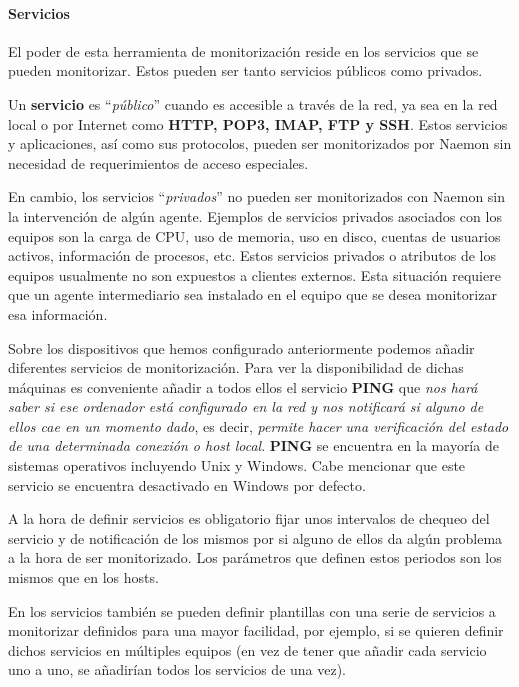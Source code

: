 \paragraph{Servicios}

El poder de esta herramienta de monitorización reside en los servicios que se pueden monitorizar. Estos pueden ser tanto servicios públicos como privados.  \cite{naemoncfg}

Un \textbf{servicio} es “\textit{público}” cuando es accesible a través de la red, ya sea en la red local o por Internet como \textbf{HTTP, POP3, IMAP, FTP y SSH}. Estos servicios y aplicaciones, así como sus protocolos, pueden ser monitorizados por Naemon sin necesidad de requerimientos de acceso especiales.

En cambio, los servicios “\textit{privados}” no pueden ser monitorizados con Naemon sin la intervención de algún agente. Ejemplos de servicios privados asociados con los equipos son la carga de CPU, uso de memoria, uso en disco, cuentas de usuarios activos, información de procesos, etc. Estos servicios privados o atributos de los equipos usualmente no son expuestos a clientes externos. Esta situación requiere que un agente intermediario sea instalado en el equipo que se desea monitorizar esa información.

Sobre los dispositivos que hemos configurado anteriormente podemos añadir diferentes servicios de monitorización. Para ver la disponibilidad de dichas máquinas es conveniente añadir a todos ellos el servicio \textbf{PING} \cite{monitoring} que \textit{nos hará saber si ese ordenador está configurado en la red y nos notificará si alguno de ellos cae en un momento dado}, es decir, \textit{permite hacer una verificación del estado de una determinada conexión o host local}. \textbf{PING} se encuentra en la mayoría de sistemas operativos incluyendo Unix y Windows. Cabe mencionar que este servicio se encuentra desactivado en Windows por defecto.

A la hora de definir servicios es obligatorio fijar unos intervalos de chequeo del servicio y de notificación de los mismos por si alguno de ellos da algún problema a la hora de ser monitorizado. Los parámetros que definen estos periodos son los mismos que en los hosts.

En los servicios también se pueden definir plantillas con una serie de servicios a monitorizar definidos para una mayor facilidad, por ejemplo, si se quieren definir dichos servicios en múltiples equipos (en vez de tener que añadir cada servicio uno a uno, se añadirían todos los servicios de una vez).

